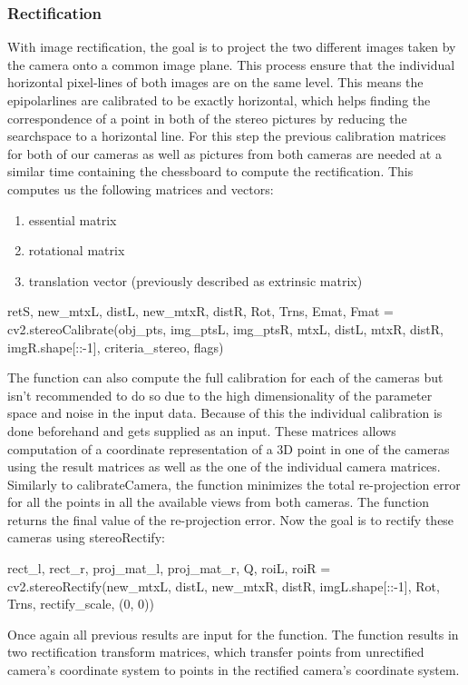 \documentclass[journal,onecolumn]{IEEEtran}
\begin{document}
\subsubsection{Rectification}
\noindent
With image rectification, the goal is to project the two different images taken by the camera onto a common image plane. This process ensure that the individual horizontal pixel-lines of both images are on the same level. This means the epipolarlines are calibrated to be exactly horizontal, which helps finding the correspondence of a point in both of the stereo pictures by reducing the searchspace to a horizontal line.
For this step the previous calibration matrices for both of our cameras as well as pictures from both cameras are needed at a similar time containing the chessboard to compute the rectification. This computes us the following matrices and vectors:
\begin{enumerate}
	\item essential matrix
	\item rotational matrix
	\item translation vector (previously described as extrinsic matrix) %
\end{enumerate}

\begin{python}
retS, new_mtxL, distL, new_mtxR, distR, Rot, Trns, Emat, Fmat = cv2.stereoCalibrate(obj_pts,
 										img_ptsL,
 										img_ptsR,
 										mtxL, distL,
 										mtxR, distR,
 										imgR.shape[::-1],
 										criteria_stereo,
 										flags)
\end{python}
The function can also compute the full calibration for each of the cameras but isn't recommended to do so due to the high dimensionality of the parameter space and noise in the input data\cite{stereoCalibrate}. Because of this the individual calibration is done beforehand and gets supplied as an input.
These matrices allows computation of a coordinate representation of a 3D point in one of the cameras using the result matrices as well as the one of the individual camera matrices.
Similarly to calibrateCamera, the function minimizes the total re-projection error for all the points in all the available views from both cameras. The function returns the final value of the re-projection error.
Now the goal is to rectify these cameras using stereoRectify:
\begin{python}
rect_l, rect_r, proj_mat_l, proj_mat_r, Q, roiL, roiR = cv2.stereoRectify(new_mtxL, 
 										distL, 
 										new_mtxR, 
 										distR,
 										imgL.shape[::-1],
  										Rot, Trns,
  										rectify_scale,
 										(0, 0))
\end{python}
Once again all previous results are input for the function. The function results in two rectification transform matrices, which transfer points from unrectified camera's coordinate system to points in the rectified camera's coordinate system.
\end{document}
